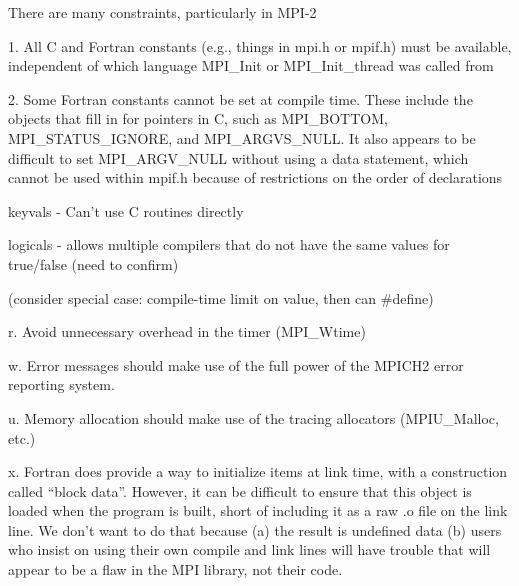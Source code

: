 % 
%
There are many constraints, particularly in MPI-2

1.  All C and Fortran constants (e.g., things in mpi.h or mpif.h) must
    be available, independent of which language MPI_Init or MPI_Init_thread 
    was called from

2.  Some Fortran constants cannot be set at compile time.  These include
    the objects that fill in for pointers in C, such as MPI_BOTTOM,
    MPI_STATUS_IGNORE, and MPI_ARGVS_NULL.  It also appears to 
    be difficult to set MPI_ARGV_NULL without using a data statement,
    which cannot be used within mpif.h because of restrictions on the
    order of declarations

keyvals - Can't use C routines directly

logicals - allows multiple compilers that do not have the same values 
for true/false (need to confirm)

    (consider special case: compile-time limit on value, then can #define)

r.  Avoid unnecessary overhead in the timer (MPI_Wtime)

w.  Error messages should make use of the full power of the MPICH2 error 
    reporting system.  

u.  Memory allocation should make use of the tracing allocators (MPIU_Malloc,
    etc.)

x.  Fortran does provide a way to initialize items at link time, with
    a construction called ``block data''.  However, it can be difficult to 
    ensure that this object is loaded when the program is built, short of 
    including it as a raw .o file on the link line.  We don't want to do that
    because (a) the result is undefined data (b) users who insist on 
    using their own compile and link lines will have trouble that will 
    appear to be a flaw in the MPI library, not their code.
